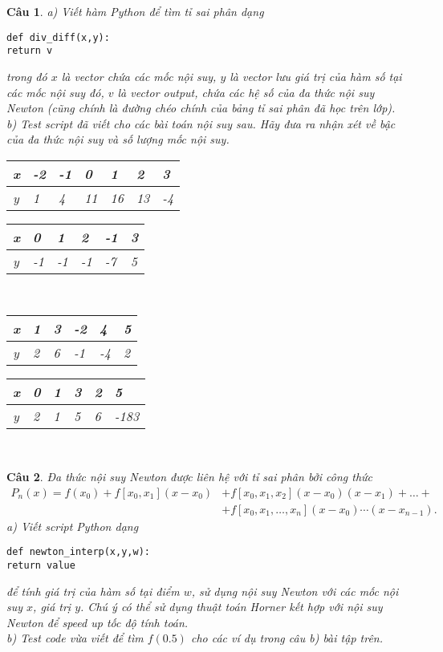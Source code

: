 \documentclass[11pt]{article}
\newtheorem{bt}{Câu}
\begin{document}
\begin{bt} a) Viết hàm Python để tìm tỉ sai phân dạng 
%
\begin{lstlisting}[frame=single] 
def div_diff(x,y):
return v
\end{lstlisting}
%
trong đó $x$ là vector chứa các mốc nội suy, $y$ là vector lưu giá trị của hàm số tại các mốc nội suy đó, $v$ là vector output, chứa các hệ số của đa thức nội suy Newton (cũng chính là đường chéo chính của bảng tỉ sai phân đã học trên lớp). \\
b) Test script đã viết cho các bài toán nội suy sau. Hãy đưa ra nhận xét về bậc của đa thức nội suy và số lượng mốc nội suy.  \\
\begin{tabular}[7]{l|l|l|l|l|l|l}
	x & -2 & -1 & 0  & 1  & 2  & 3 \\ \hline 
	y & 1  & 4  & 11 & 16 & 13 & -4
\end{tabular}	
\hfill 
\begin{tabular}[6]{l|l|l|l|l|l}
	x & 0 & 1 & 2  & -1  & 3 \\ \hline 
	y & -1  & -1  & -1 & -7 & 5
\end{tabular}	\\
\begin{tabular}[6]{l|l|l|l|l|l}
	x & 1 & 3 & -2  & 4  & 5 \\ \hline 
	y & 2  & 6  & -1 & -4 & 2
\end{tabular}
\hfill 
\begin{tabular}[6]{l|l|l|l|l|l}
	x & 0 & 1 & 3  & 2  & 5 \\ \hline 
	y & 2  & 1  & 5 & 6 & -183
\end{tabular}\\
\end{bt}

\begin{bt}
Đa thức nội suy Newton được liên hệ với tỉ sai phân bởi công thức
%
\begin{align*}
P_n(x) = f(x_0)+f[x_0,x_1](x-x_0) &+f[x_0,x_1,x_2](x-x_0)(x-x_1)+ \dots + \\ 
&+ f[x_0,x_1,\dots,x_n](x-x_0)\cdots(x-x_{n-1}).
\end{align*}
%
a) Viết script Python dạng 
%
\begin{lstlisting}[frame=single] 
def newton_interp(x,y,w):
return value
\end{lstlisting}
%
để tính giá trị của hàm số tại điểm $w$, sử dụng nội suy Newton với các mốc nội suy $x$, giá trị $y$. Chú ý có thể sử dụng thuật toán Horner kết hợp với nội suy Newton để speed up tốc độ tính toán. \\	
b) Test code vừa viết để tìm $f(0.5)$ cho các ví dụ trong câu b) bài tập trên. 
\end{bt}
\end{document}
